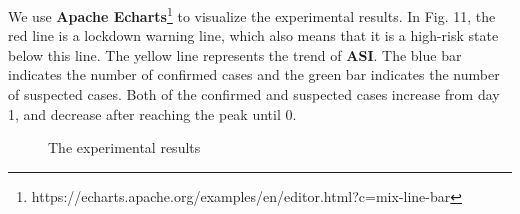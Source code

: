 \documentclass[conference]{IEEEtran}
\begin{document}
We use \textbf{Apache Echarts}\footnote{https://echarts.apache.org/examples/en/editor.html?c=mix-line-bar} to visualize the experimental results.
In Fig. 11, the red line is a lockdown warning line, which also means that it is a high-risk state below this line.
The yellow line represents the trend of \textbf{ASI}.
The blue bar indicates the number of confirmed cases and the green bar indicates the number of suspected cases.
Both of the confirmed and suspected cases increase from day 1, and decrease after reaching the peak until 0.
\begin{figure}[h]
    \centering
    \caption{The experimental results}
\end{figure}
\end{document}

